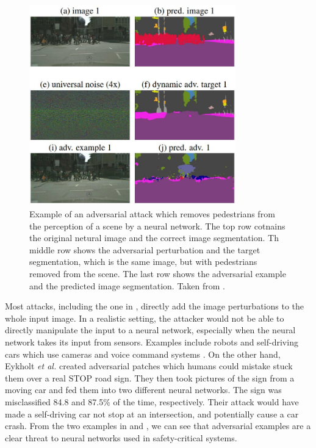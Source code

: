 \begin{figure}[ht]
    \centering
    \includegraphics[width=0.8\textwidth]{graphics/adversarial_segmentation.JPG}
    \caption{Example of an adversarial attack which removes pedestrians from the perception of a scene by a neural network. The top row cotnains the original netural image and the correct image segmentation. Th middle row shows the adversarial perturbation and the target segmentation, which is the same image, but with pedestrians removed from the scene. The last row shows the adversarial example and the predicted image segmentation. Taken from \cite{Metzen_2017_ICCV}.}
    \label{fig:adversarial_segmentation}
\end{figure}

Most attacks, including the one in \cite{Metzen_2017_ICCV}, directly add the image perturbations to the whole input image. In a realistic setting, the attacker would not be able to directly manipulate the input to a neural network, especially when the neural network takes its input from sensors. Examples include robots and self-driving cars which use cameras and voice command systems \cite{kurakin2016adversarial}. On the other hand, Eykholt \textit{et al.} \cite{evtimov_road_signs} created adversarial patches which humans could mistake stuck them over a real STOP road sign. They then took pictures of the sign from a moving car and fed them into two different neural networks. The sign was misclassified 84.8 and 87.5\% of the time, respectively. Their attack would have made a self-driving car not stop at an intersection, and potentially cause a car crash. From the two examples in \cite{evtimov_road_signs} and \cite{Metzen_2017_ICCV}, we can see that adversarial examples are a clear threat to neural networks used in safety-critical systems.

